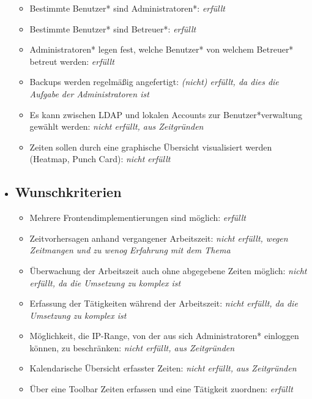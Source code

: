 \begin{itemize}
\begin{itemize}
    	\item Bestimmte Benutzer* sind Administratoren*: \emph{erfüllt}
    	\item Bestimmte Benutzer* sind Betreuer*: \emph{erfüllt}
    	\item Administratoren* legen fest, welche Benutzer* von welchem Betreuer* betreut werden: \emph{erfüllt}
    	\item Backups werden regelmäßig angefertigt: \emph{(nicht) erfüllt, da dies die Aufgabe der Administratoren ist}
    	\item Es kann zwischen LDAP und lokalen Accounts zur Benutzer*verwaltung gewählt werden: \emph{nicht erfüllt, aus Zeitgründen}
    	\item Zeiten sollen durch eine graphische Übersicht visualisiert werden (Heatmap, Punch Card): \emph{nicht erfüllt}
  \end{itemize}
    
    
  \newpage
    \item \subsection{Wunschkriterien}
    \begin{itemize}
	    \item Mehrere Frontendimplementierungen sind möglich: \emph{erfüllt}
    	\item Zeitvorhersagen anhand vergangener Arbeitszeit: \emph{nicht erfüllt, wegen Zeitmangen und zu wenog Erfahrung mit dem Thema}
    	\item Überwachung der Arbeitszeit auch ohne abgegebene Zeiten möglich: \emph{nicht erfüllt, da die Umsetzung zu komplex ist} 
    	\item Erfassung der Tätigkeiten während der Arbeitszeit: \emph{nicht erfüllt, da die Umsetzung zu komplex ist}
    	\item Möglichkeit, die IP-Range, von der aus sich Administratoren* einloggen können, zu beschränken: \emph{nicht erfüllt, aus Zeitgründen}
    	\item Kalendarische Übersicht erfasster Zeiten: \emph{nicht erfüllt, aus Zeitgründen}
    	\item Über eine Toolbar Zeiten erfassen und eine Tätigkeit zuordnen: \emph{erfüllt}
  \end{itemize}
  \end{itemize}



      
